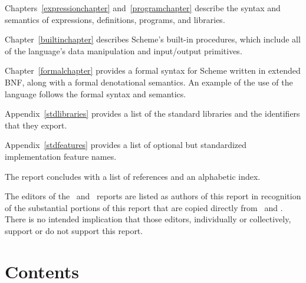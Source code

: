 \vest Chapters~\ref{expressionchapter} and~\ref{programchapter} describe
the syntax and semantics of expressions, definitions, programs, and libraries.

\vest Chapter~\ref{builtinchapter} describes Scheme's built-in
procedures, which include all of the language's data manipulation and
input/output primitives.

\vest Chapter~\ref{formalchapter} provides a formal syntax for Scheme
written in extended BNF, along with a formal denotational semantics.
An example of the use of the language follows the formal syntax and
semantics.

\vest Appendix~\ref{stdlibraries} provides a list of the standard libraries
and the identifiers that they export.

\vest Appendix~\ref{stdfeatures} provides a list of optional but standardized
implementation feature names.


\vest The report concludes with a list of references and an
alphabetic index.

\begin{note}
The editors of the \rfivers\ and \rsixrs\ reports are
listed as authors of this report in recognition of the substantial
portions of this report that are copied directly from \rfivers\ and \rsixrs.
There is no intended implication that those editors, individually or
collectively, support or do not support this report.
\end{note}

\vfill
\eject

\chapter*{Contents}
\addvspace{3.5pt}                  %
\renewcommand{\tocshrink}{-3.5pt}  %
{\footnotesize
\tableofcontents
}

\vfill
\eject
